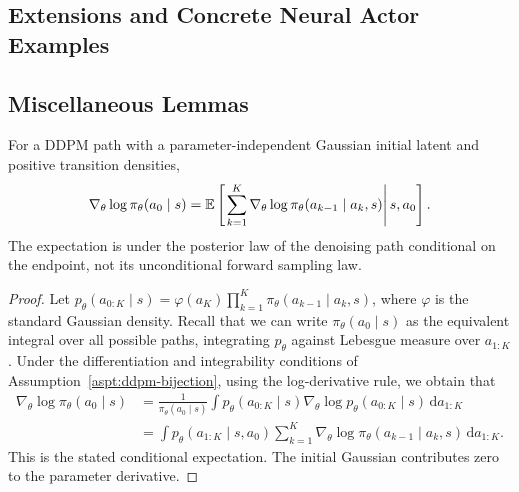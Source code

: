 \subsection{Extensions and Concrete Neural Actor Examples}
\label{app:intrinsic-npg-lift}
\label{prop:intrinsic-npg-lift}
\label{app:redundant-parameter-lift}
\label{app:npg-mixing}
\label{thm:npg-mixing-regret}
\label{app:hybrid-reset-dist}
\label{lem:hybrid-reset-dist}
\label{lem:hybrid-is-label}
\label{eq:hybrid-is-moment}
\label{thm:hybrid-npg-regret}
\label{app:joint-stochastic-example}
\label{eq:joint-average-curvature}
\label{eq:joint-identities}
\label{prop:joint-stochastic-example}
\label{eq:joint-coefficient}
\label{eq:joint-noise-event}
\label{eq:joint-envelope}
\label{app:example-interactions}
\label{app:two-layer-shape-example}
\label{eq:two-layer-actor}
\label{eq:two-layer-noise-budget}
\label{prop:two-layer-shape-learning}


\subsection{Miscellaneous Lemmas}

\begin{lem}
For a DDPM path with a parameter-independent Gaussian initial latent and
positive transition densities,
\[
\nabla_\theta\log\pi_\theta(a_0\mid s)
=\mathbb{E}\left[\left.\sum_{k=1}^K
\nabla_\theta\log\pi_\theta(a_{k-1}\mid a_k,s)
\right|s,a_0\right].
\]
The expectation is under the posterior law of the denoising path conditional
on the endpoint, not its unconditional forward sampling law.
\label{lem:diffusion-policy-score}
\end{lem}

\begin{proof}
Let $p_\theta(a_{0:K}\mid s)=\varphi(a_K)
\prod_{k=1}^K\pi_\theta(a_{k-1}\mid a_k,s)$, where $\varphi$ is the standard
Gaussian density. Recall that we can write $\pi_\theta(a_0\mid s)$ as the equivalent integral over all possible paths, integrating $p_\theta$ against Lebesgue measure over $a_{1:K}$. Under the differentiation and integrability conditions of Assumption~\ref{aspt:ddpm-bijection}, using the log-derivative rule, we obtain that
\begin{align*}
\nabla_\theta\log\pi_\theta(a_0\mid s)
&=\frac1{\pi_\theta(a_0\mid s)}
\int p_\theta(a_{0:K}\mid s)\nabla_\theta\log p_\theta(a_{0:K}\mid s)
\,\mathrm da_{1:K}\\
&=\int p_\theta(a_{1:K}\mid s,a_0)
\sum_{k=1}^K\nabla_\theta\log\pi_\theta(a_{k-1}\mid a_k,s)
\,\mathrm da_{1:K}.
\end{align*}
This is the stated conditional expectation. The initial Gaussian contributes
zero to the parameter derivative.
\end{proof}


